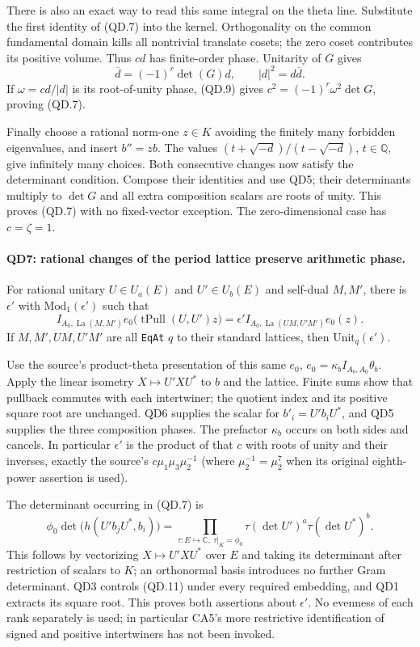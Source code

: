 There is also an exact way to read this same integral on the
theta line.  Substitute the first identity of (QD.7) into the
kernel.  Orthogonality on the common fundamental domain kills
all nontrivial translate cosets; the zero coset contributes its
positive volume.  Thus $cd$ has finite-order phase.  Unitarity
of $G$ gives
\[
       \overline d=(-1)^r\det(G)d,
       \qquad |d|^2=d\overline d.                         \tag{QD.9}
\]
If $\omega=cd/|d|$ is its root-of-unity phase, (QD.9) gives
$c^2=(-1)^r\omega^2\det G$, proving (QD.7).

Finally choose a rational norm-one $z\in K$ avoiding the finitely
many forbidden eigenvalues, and insert $b''=zb$.
The values $(t+\sqrt{-d})/(t-\sqrt{-d})$, $t\in\mathbb Q$,
give infinitely many choices.  Both consecutive changes now
satisfy the determinant condition.  Compose their identities
and use QD5; their determinants multiply to $\det G$ and all
extra composition scalars are roots of unity.  This proves
(QD.7) with no fixed-vector exception.  The zero-dimensional
case has $c=\zeta=1$.

\paragraph{QD7: rational changes of the period lattice preserve arithmetic phase.}
For rational unitary $U\in U_a(E)$ and $U'\in U_b(E)$ and
self-dual $M,M'$, there is $\epsilon'$ with
$\mathrm{Mod}_1(\epsilon')$ such that
\[
 I_{A_0,\operatorname{La}(M,M')}e_0
          \bigl(\operatorname{tPull}(U,U')z\bigr)
 =\epsilon' I_{A_0,\operatorname{La}(UM,U'M')}e_0(z).      \tag{QD.10}
\]
If $M,M',UM,U'M'$ are all \texttt{EqAt} $q$ to their standard
lattices, then $\mathrm{Unit}_q(\epsilon')$.

Use the source's product-theta presentation of this same $e_0$,
$e_0=\kappa_b I_{A_b,A_0}\theta_b$.  Apply the linear isometry
$X\mapsto U'XU^*$ to $b$ and the lattice.  Finite sums show
that pullback commutes with each intertwiner; the quotient index
and its positive square root are unchanged.  QD6 supplies the
scalar for $b'_i=U'b_iU^*$, and QD5 supplies the three composition
phases.  The prefactor $\kappa_b$ occurs on both sides and cancels.
In particular $\epsilon'$ is the product of that $c$ with roots
of unity and their inverses, exactly the source's
$c\mu_1\mu_3\mu_2^{-1}$ (where $\mu_2^{-1}=\mu_2^7$
when its original eighth-power assertion is used).

The determinant occurring in (QD.7) is
\[
 \phi_0\det\bigl(h(U'b_jU^*,b_i)\bigr)
   =\prod_{\tau:E\hookrightarrow\mathbb C,\ \tau|_K=\phi_0}
          \tau(\det U')^a\tau(\det U^*)^b.                \tag{QD.11}
\]
This follows by vectorizing $X\mapsto U'XU^*$ over $E$ and
taking its determinant after restriction of scalars to $K$;
an orthonormal basis introduces no further Gram determinant.
QD3 controls (QD.11) under every required embedding, and QD1
extracts its square root.  This proves both assertions about
$\epsilon'$.  No evenness of each rank separately is used;
in particular CA5's more restrictive identification of signed
and positive intertwiners has not been invoked.

